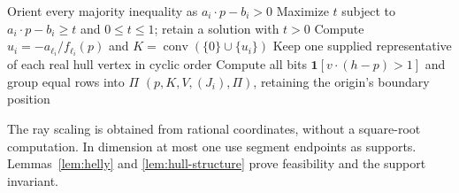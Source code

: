 \begin{algorithm}[H]
\caption{\HullData: a flat state's witness, supports, and patterns}
\label{alg:hull-data}
Orient every majority inequality as $a_i\cdot p-b_i>0$\;
Maximize $t$ subject to $a_i\cdot p-b_i\ge t$ and $0\le t\le1$;
retain a solution with $t>0$\;
Compute $u_i=-a_{\ell_i}/f_{\ell_i}(p)$ and
$K=\operatorname{conv}(\{0\}\cup\{u_i\})$\;
Keep one supplied representative of each real hull vertex in cyclic order\;
Compute all bits $\mathbf1[v\cdot(h-p)>1]$ and group equal rows into $\Pi$\;
\KwRet $(p,K,V,(J_i),\Pi)$, retaining the origin's boundary position\;
\end{algorithm}

The ray scaling is obtained from rational coordinates, without a
square-root computation. In dimension at most one use segment
endpoints as supports. Lemmas~\ref{lem:helly} and
\ref{lem:hull-structure} prove feasibility and the support invariant.
